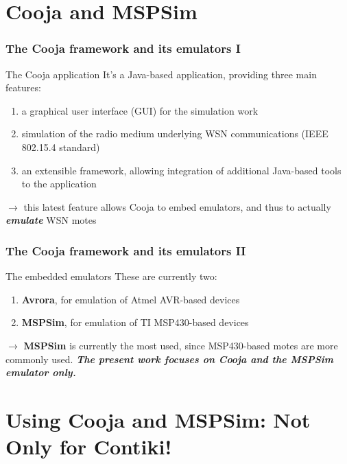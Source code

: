 \documentclass[10pt,c]{beamer}
\renewcommand{\emph}[1]{\textbf{\textit{#1}}}
\newcommand{\nom}[1]{\textbf{#1}}
\begin{document}

\section{Cooja and MSPSim}

\begin{frame}
\frametitle{The Cooja framework and its emulators I}
\begin{block}{The Cooja application}
It's a Java-based application, providing three main features:
\begin{enumerate}
\item a graphical user interface (GUI) for the simulation work
\item simulation of the radio medium underlying WSN communications
(IEEE 802.15.4 standard)
\item an extensible framework, allowing integration of additional
Java-based tools to the application
\end{enumerate}
$\rightarrow$ this latest feature allows Cooja to embed emulators,
and thus to actually \emph{emulate} WSN motes
\end{block}
\end{frame}

\begin{frame}
\frametitle{The Cooja framework and its emulators II}
\begin{exampleblock}{The embedded emulators}
These are currently two:
\begin{enumerate}
\item \nom{Avrora}, for emulation of Atmel AVR-based devices
\item \nom{MSPSim}, for emulation of TI MSP430-based devices
\end{enumerate}
$\rightarrow$ \nom{MSPSim} is currently the most used, since
MSP430-based motes are more commonly used. \emph{The present work
focuses on Cooja and the MSPSim emulator only.}
\end{exampleblock}
\end{frame}


\section{Using Cooja and MSPSim: Not Only for Contiki!}
\end{document}
